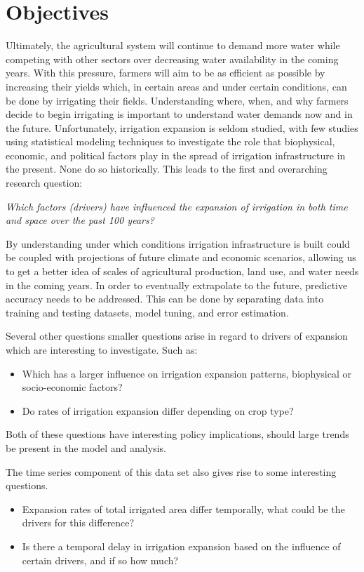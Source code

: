 \documentclass[12pt,twoside]{reedthesis}
\begin{document}
\hypertarget{objectives}{%
\section{Objectives}\label{objectives}}

Ultimately, the agricultural system will continue to demand more water while competing with other sectors over decreasing water availability in the coming years. With this pressure, farmers will aim to be as efficient as possible by increasing their yields which, in certain areas and under certain conditions, can be done by irrigating their fields. Understanding where, when, and why farmers decide to begin irrigating is important to understand water demands now and in the future. Unfortunately, irrigation expansion is seldom studied, with few studies using statistical modeling techniques to investigate the role that biophysical, economic, and political factors play in the spread of irrigation infrastructure in the present. None do so historically. This leads to the first and overarching research question:

\emph{Which factors (drivers) have influenced the expansion of irrigation in both time and space over the past 100 years?}

By understanding under which conditions irrigation infrastructure is built could be coupled with projections of future climate and economic scenarios, allowing us to get a better idea of scales of agricultural production, land use, and water needs in the coming years. In order to eventually extrapolate to the future, predictive accuracy needs to be addressed. This can be done by separating data into training and testing datasets, model tuning, and error estimation.

Several other questions smaller questions arise in regard to drivers of expansion which are interesting to investigate. Such as:
\begin{itemize}
\item
  Which has a larger influence on irrigation expansion patterns, biophysical or socio-economic factors?
\item
  Do rates of irrigation expansion differ depending on crop type?
\end{itemize}
Both of these questions have interesting policy implications, should large trends be present in the model and analysis.

The time series component of this data set also gives rise to some interesting questions.
\begin{itemize}
\item
  Expansion rates of total irrigated area differ temporally, what could be the drivers for this difference?
\item
  Is there a temporal delay in irrigation expansion based on the influence of certain drivers, and if so how much?
\end{itemize}
\end{document}
